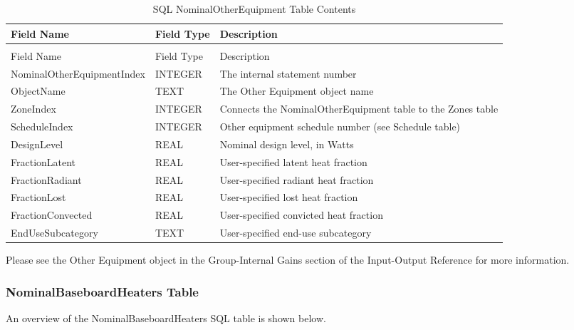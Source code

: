{\scriptsize
\begin{longtable}[c]{>{\raggedright}p{1.5in}>{\raggedright}p{1.5in}>{\raggedright}p{2.99in}}
\caption{SQL NominalOtherEquipment Table Contents \label{table:table-21.-sql-nominalotherequipment-table}} \tabularnewline
\toprule 
Field Name & Field Type & Description \tabularnewline
\midrule
\endfirsthead

\caption[]{SQL NominalOtherEquipment Table Contents} \tabularnewline
\toprule 
Field Name & Field Type & Description \tabularnewline
\midrule
\endhead

Nominal\-Other\-Equipment\-Index & INTEGER & The internal statement number \tabularnewline
ObjectName & TEXT & The Other Equipment object name \tabularnewline
ZoneIndex & INTEGER & Connects the NominalOtherEquipment table to the Zones table \tabularnewline
ScheduleIndex & INTEGER & Other equipment schedule number (see Schedule table) \tabularnewline
DesignLevel & REAL & Nominal design level, in Watts \tabularnewline
FractionLatent & REAL & User-specified latent heat fraction \tabularnewline
FractionRadiant & REAL & User-specified radiant heat fraction \tabularnewline
FractionLost & REAL & User-specified lost heat fraction \tabularnewline
FractionConvected & REAL & User-specified convicted heat fraction \tabularnewline
EndUseSubcategory & TEXT & User-specified end-use subcategory \tabularnewline
\bottomrule
\end{longtable}}

Please see the Other Equipment object in the Group-Internal Gains section of the Input-Output Reference for more information.

\subsubsection{NominalBaseboardHeaters Table}

An overview of the NominalBaseboardHeaters SQL table is shown below.


